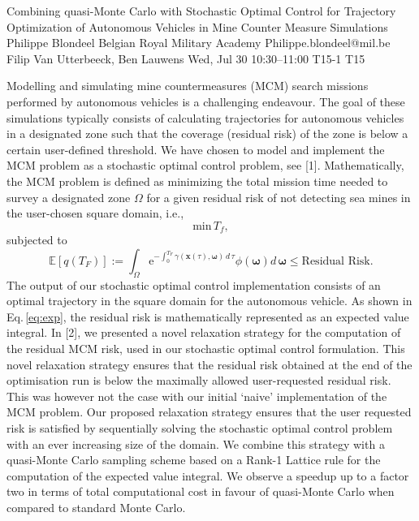 \begin{talk}
  {Combining quasi-Monte Carlo with Stochastic Optimal Control for Trajectory Optimization of Autonomous Vehicles in Mine Counter Measure Simulations}%
  {Philippe Blondeel}%
  {Belgian Royal Military Academy}%
  {Philippe.blondeel@mil.be}%
  {Filip Van Utterbeeck, Ben Lauwens}%
  {}%
  {Wed, Jul 30 10:30--11:00}%
  {T15-1}%
  {T15}%
  
    
   
Modelling and simulating mine countermeasures (MCM) search missions performed by autonomous vehicles is a challenging endeavour. The goal of these simulations typically consists of calculating trajectories for autonomous vehicles in a designated zone such that the coverage (residual risk) of the zone is below a certain user-defined threshold. We have chosen to model and implement the MCM problem as a stochastic optimal control problem, see [1]. Mathematically, the MCM problem is defined as minimizing the total mission time needed to survey a designated zone $\Omega$ for a given residual risk of not detecting sea mines in the  user-chosen square  domain, i.e., 
\begin{equation}
\text{min}\, T_f,
\label{eq:min}
\end{equation}
subjected to
\begin{equation}
 \mathbb{E}[q\left(T_F\right)] :=  \int_\Omega \text{e}^{-\int_0^{T_F} \gamma\left(\bm{x}\left(\tau\right),\bm{\omega}\right)\, d\,\tau}\phi\left(\bm{\omega}\right) d\,\bm{\omega} \leq \text{Residual Risk}.
\label{eq:exp}
\end{equation}
The output of our stochastic optimal control implementation consists of an optimal trajectory in the square domain for the autonomous vehicle.  As shown in Eq.\,\eqref{eq:exp}, the residual risk is mathematically represented as an expected value integral. In [2], we presented a novel relaxation strategy for the computation of the residual MCM risk, used in our stochastic optimal control formulation. This novel relaxation strategy ensures that the  residual risk obtained at the end of the optimisation run is below the maximally allowed user-requested residual risk. This was however not the case  with our initial `naive' implementation of the MCM problem. Our proposed relaxation strategy ensures that the user requested risk is satisfied by sequentially solving the stochastic optimal control problem with an ever increasing size of the domain. We combine this strategy with  a quasi-Monte Carlo  sampling scheme based on a Rank-1 Lattice rule for the computation of the expected value integral. We observe a speedup up to a factor two in terms of total computational cost in favour of quasi-Monte Carlo when compared to standard Monte Carlo.



\end{talk}
